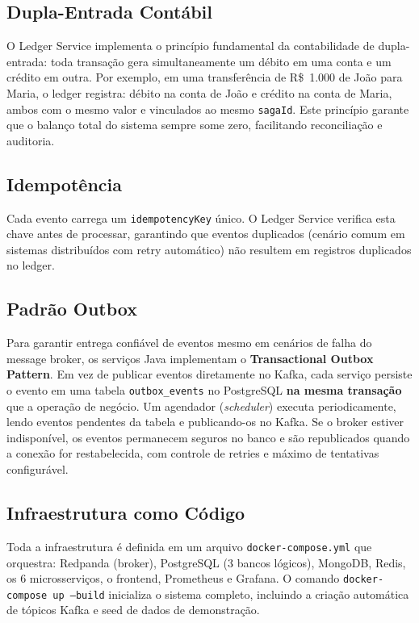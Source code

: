 \documentclass[12pt]{article}
\begin{document}
\subsection{Dupla-Entrada Cont\'{a}bil}

O Ledger Service implementa o princ\'{i}pio fundamental da contabilidade de dupla-entrada: toda transa\c{c}\~{a}o gera simultaneamente um d\'{e}bito em uma conta e um cr\'{e}dito em outra. Por exemplo, em uma transfer\^{e}ncia de R\$~1.000 de Jo\~{a}o para Maria, o ledger registra: d\'{e}bito na conta de Jo\~{a}o e cr\'{e}dito na conta de Maria, ambos com o mesmo valor e vinculados ao mesmo \texttt{sagaId}. Este princ\'{i}pio garante que o balan\c{c}o total do sistema sempre some zero, facilitando reconcilia\c{c}\~{a}o e auditoria.

\subsection{Idempot\^{e}ncia}

Cada evento carrega um \texttt{idempotencyKey} \'{u}nico. O Ledger Service verifica esta chave antes de processar, garantindo que eventos duplicados (cen\'{a}rio comum em sistemas distribu\'{i}dos com retry autom\'{a}tico) n\~{a}o resultem em registros duplicados no ledger.

\subsection{Padr\~{a}o Outbox}

Para garantir entrega confi\'{a}vel de eventos mesmo em cen\'{a}rios de falha do message broker, os servi\c{c}os Java implementam o \textbf{Transactional Outbox Pattern}. Em vez de publicar eventos diretamente no Kafka, cada servi\c{c}o persiste o evento em uma tabela \texttt{outbox\_events} no PostgreSQL \textbf{na mesma transa\c{c}\~{a}o} que a opera\c{c}\~{a}o de neg\'{o}cio. Um agendador (\textit{scheduler}) executa periodicamente, lendo eventos pendentes da tabela e publicando-os no Kafka. Se o broker estiver indispon\'{i}vel, os eventos permanecem seguros no banco e s\~{a}o republicados quando a conex\~{a}o for restabelecida, com controle de retries e m\'{a}ximo de tentativas configur\'{a}vel.

\subsection{Infraestrutura como C\'{o}digo}

Toda a infraestrutura \'{e} definida em um arquivo \texttt{docker-compose.yml} que orquestra: Redpanda (broker), PostgreSQL (3 bancos l\'{o}gicos), MongoDB, Redis, os 6 microsservi\c{c}os, o frontend, Prometheus e Grafana. O comando \texttt{docker-compose up --build} inicializa o sistema completo, incluindo a cria\c{c}\~{a}o autom\'{a}tica de t\'{o}picos Kafka e seed de dados de demonstra\c{c}\~{a}o.
\end{document}
